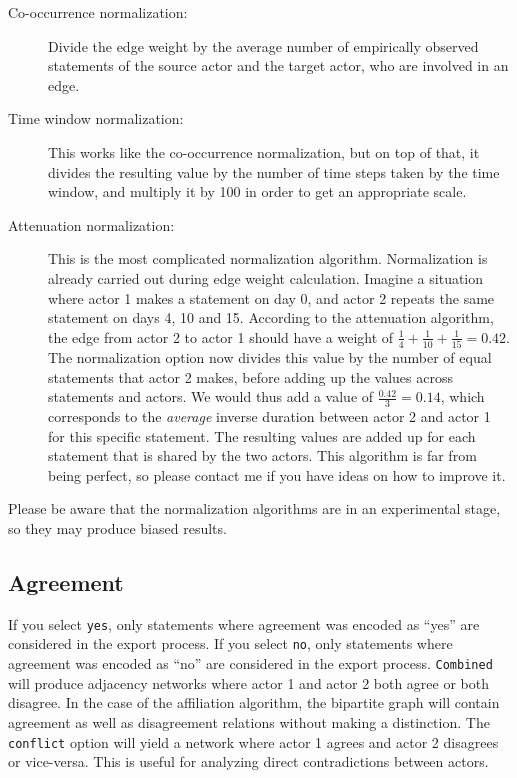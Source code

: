 \documentclass[12pt,a4paper]{scrreprt}
\newcommand{\code}[1]{\texttt{#1}}
\begin{document}
\begin{description}
 \item[Co-occurrence normalization:] Divide the edge weight by the average number of empirically observed statements of the source actor and the target actor, who are involved in an edge.
 \item[Time window normalization:] This works like the co-occurrence normalization, but on top of that, it divides the resulting value by the number of time steps taken by the time window, and multiply it by 100 in order to get an appropriate scale.
 \item[Attenuation normalization:] This is the most complicated normalization algorithm. Normalization is already carried out during edge weight calculation. Imagine a situation where actor 1 makes a statement on day 0, and actor 2 repeats the same statement on days 4, 10 and 15. According to the attenuation algorithm, the edge from actor 2 to actor 1 should have a weight of $\frac{1}{4} + \frac{1}{10} + \frac{1}{15} = 0.42$. The normalization option now divides this value by the number of equal statements that actor 2 makes, before adding up the values across statements and actors. We would thus add a value of $\frac{0.42}{3} = 0.14$, which corresponds to the \emph{average} inverse duration between actor 2 and actor 1 for this specific statement. The resulting values are added up for each statement that is shared by the two actors. This algorithm is far from being perfect, so please contact me if you have ideas on how to improve it.
\end{description}
Please be aware that the normalization algorithms are in an experimental stage, so they may produce biased results.

\subsection{Agreement}\label{agreement}
If you select \code{yes}, only statements where agreement was encoded as ``yes'' are considered in the export process. If you select \code{no}, only statements where agreement was encoded as ``no'' are considered in the export process. \code{Combined} will produce adjacency networks where actor 1 and actor 2 both agree or both disagree. In the case of the affiliation algorithm, the bipartite graph will contain agreement as well as disagreement relations without making a distinction. The \code{conflict} option will yield a network where actor 1 agrees and actor 2 disagrees or vice-versa. This is useful for analyzing direct contradictions between actors.
\end{document}
